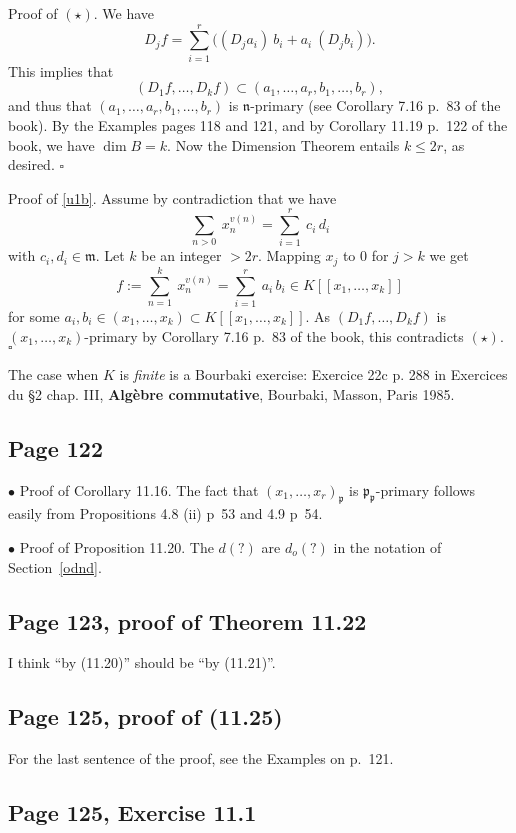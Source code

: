 \documentclass[parskip=half,fontsize=12pt]{scrartcl}%
\newcommand{\mf}{\mathfrak}
\newcommand{\mmm}{\mf m}
\newcommand{\ppp}{\mf p}
\newcommand{\bu}{\bullet}
\begin{document}
Proof of $(\star)$. We have 
$$
D_jf=\sum_{i=1}^r\Big((D_ja_i)\ b_i+a_i\ (D_jb_i)\Big). 
$$ 
This implies that 
$$
(D_1f,\dots,D_kf)\subset(a_1,\dots,a_r,b_1,\dots,b_r),
$$ 
and thus that $(a_1,\dots,a_r,b_1,\dots,b_r)$ is $\mathfrak n$-primary (see Corollary 7.16 p.~83 of the book). By the Examples pages 118 and 121, and by Corollary 11.19 p.~122 of the book, we have $\dim B=k$. Now the Dimension Theorem entails $k\le2r$, as desired. $\square$

Proof of \eqref{u1b}. Assume by contradiction that we have 
$$
\sum_{n>0}\ x_n^{v(n)}=\sum_{i=1}^r\ c_i\,d_i
$$ 
with $c_i,d_i\in\mmm$. Let $k$ be an integer $>2r$. Mapping $x_j$ to $0$ for $j>k$ we get 
$$
f:=\sum_{n=1}^k\ x_n^{v(n)}=\sum_{i=1}^r\ a_i\,b_i\in K[[x_1,\dots,x_k]]
$$ 
for some $a_i,b_i\in(x_1,\dots,x_k)\subset K[[x_1,\dots,x_k]]$. As $(D_1f,\dots,D_kf)$ is $(x_1,\dots,x_k)$-primary by Corollary 7.16 p.~83 of the book, this contradicts $(\star)$. $\square$

The case when $K$ is \emph{finite} is a Bourbaki exercise: Exercice 22c p. 288 in Exercices du \S2 chap. III, \textbf{Algèbre commutative}, Bourbaki, Masson, Paris 1985.

\subsection{Page 122}%

$\bu$ Proof of Corollary 11.16. The fact that $(x_1,\dots,x_r)_\ppp$ is $\ppp_\ppp$-primary follows easily from Propositions 4.8 (ii) p~53 and 4.9 p~54.

$\bu$ Proof of Proposition 11.20. The $d(?)$ are $d_o(?)$ in the notation of Section~\ref{odnd}.

\subsection{Page 123, proof of Theorem 11.22}%

I think ``by (11.20)'' should be ``by (11.21)''.

\subsection{Page 125, proof of (11.25)}%

For the last sentence of the proof, see the Examples on p.~121.

\subsection{Page 125, Exercise 11.1}%
\end{document}
